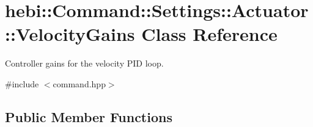 \hypertarget{classhebi_1_1Command_1_1Settings_1_1Actuator_1_1VelocityGains}{}\section{hebi\+:\+:Command\+:\+:Settings\+:\+:Actuator\+:\+:Velocity\+Gains Class Reference}
\label{classhebi_1_1Command_1_1Settings_1_1Actuator_1_1VelocityGains}


Controller gains for the velocity P\+ID loop.  




{\ttfamily \#include $<$command.\+hpp$>$}

\subsection*{Public Member Functions}
